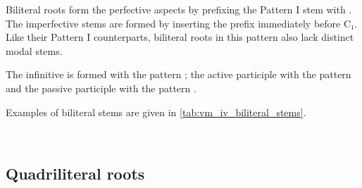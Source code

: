 \documentclass[grammar]{subfiles}
\begin{document}
Biliteral roots form the perfective aspects by prefixing the Pattern I stem
with .  The imperfective stems are formed by inserting the prefix
 immediately before C₁.  Like their Pattern I counterparts, biliteral
roots in this pattern also lack distinct modal stems. 

The infinitive is formed with the pattern ; the active participle
with the pattern  and the passive participle with the pattern
. 

Examples of biliteral stems are given in \cref{tab:vm_iv_biliteral_stems}. 

\begin{table}[h!]\small\capstart
  \centering
  \\
  \caption{Pattern IV biliteral stems \label{tab:vm_iv_biliteral_stems}}
\end{table}
    

\subsection{Quadriliteral roots}
\label{ssec:vm_iv_quadriliteral_roots}
\end{document}
